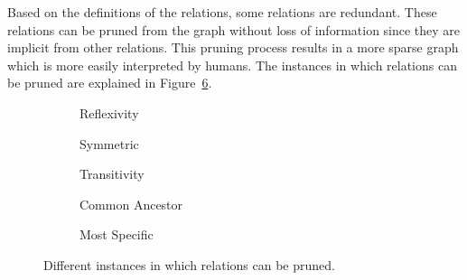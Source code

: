 Based on the definitions of the relations, some relations are redundant. 
These relations can be pruned from the graph without loss of information since they are implicit from other relations. 
This pruning process results in a more sparse graph which is more easily interpreted by humans.
The instances in which relations can be pruned are explained in Figure~\ref{fig:Pruning}.
%
%
\begin{figure}
    \newcommand{\subfigurelength}{0.35\textwidth} %
    \centering
    \begin{subfigure}{\subfigurelength}
        \centering
        
        \caption{Reflexivity}
        \label{sfig:Reflexivity}
    \end{subfigure}
    \begin{subfigure}{\subfigurelength}
        \centering
        
        \caption{Symmetric}
        \label{sfig:Symmetry}
    \end{subfigure}
    \begin{subfigure}{\subfigurelength}
        \centering
        
        \caption{Transitivity}
        \label{sfig:Transitivity}
    \end{subfigure}
    \begin{subfigure}{\subfigurelength}
        \centering
        
        \caption{Common Ancestor}
        \label{sfig:Common-Ancestor}
    \end{subfigure}
    \begin{subfigure}{\subfigurelength}
        \centering
        
        \caption{Most Specific}
        \label{sfig:Most-Specific}
    \end{subfigure}
    \caption{Different instances in which relations can be pruned.}
    \label{fig:Pruning}
\end{figure}
